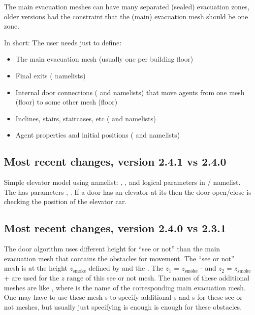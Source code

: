 \documentclass[12pt,a4paper,final,twoside]{stylevk}
\begin{document}
The main evacuation meshes can have many separated (sealed) evacuation
zones, older versions had the constraint that the (main) evacuation
mesh should be one zone.

In short: The user needs just to define:
\begin{itemize}
  \item The main evacuation mesh (usually one per building floor)
  \item Final exits ( namelists)
  \item Internal door connections ( and 
    namelists) that move agents from one mesh (floor) to some other
    mesh (floor)
  \item Inclines, stairs, staircases, etc ( and
     namelists)
  \item Agent properties and initial positions ( and
     namelists)
\end{itemize}

\subsection{Most recent changes, version 2.4.1 vs
  2.4.0}\label{Sec_241vs240} 

Simple elevator model using  namelist:
, , and
 logical parameters in
/ namelist.  The  has parameters
, .  If a door has an
elevator  at its  then the door open/close
is checking the position of the elevator car.

\subsection{Most recent changes, version 2.4.0 vs
  2.3.1}\label{Sec_240vs231} 

\noindent  The door algorithm uses different height for ``see or not''
than the main evacuation mesh that contains the obstacles for
movement.  The ``see or not'' mesh is at the height $z_\textrm{smoke}$
defined by  and the
.  The $z_1$ = $z_\textrm{smoke}$ -
 and $z_2$ = $z_\textrm{smoke}$ +
 are used for the $z$ range of this see or not
mesh.  The names of these additional meshes are like
, where  is the name of the
corresponding main evacuation mesh.  One may have to use these mesh
s to specify additional s and s for these see-or-not meshes,
but usually just specifying  is enough is
enough for these obstacles.
\end{document}
